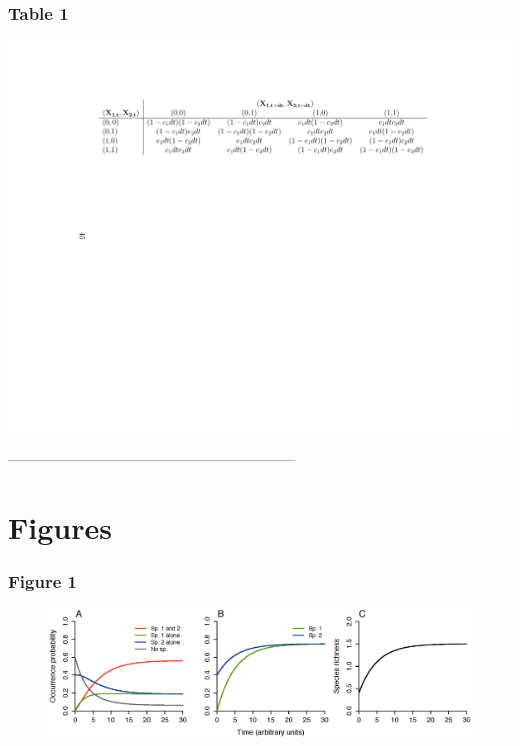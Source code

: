 \subsubsection*{Table 1}
\begin{table}[h!]
\centering
\includegraphics[scale=0.85]{./chapitre1/table1.pdf}
\caption{}
\label{tb1}
\end{table}



--------------------------------------------------------------
\section{Figures}


\subsubsection*{Figure 1}
\begin{figure}[h!]
\centering
\includegraphics[width=\textwidth]{./chapitre1/fig1.eps}
\caption{}
\label{fig1}
\end{figure}
%
%
%
